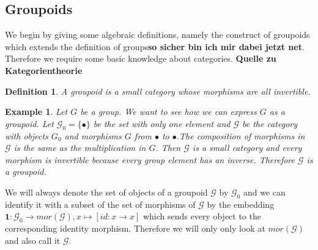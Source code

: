 \documentclass[12pt,a4paper]{scrartcl}
\newtheorem{Definition}[Theorem]{Definition}
\newtheorem{Example}[Theorem]{Example}
\numberwithin{equation}{section}
\newcommand{\2}{\mathbb{Z} / 2 \mathbb{Z}}
\newcommand{\1}{\overline{1}}
\newcommand{\0}{\overline{0}}
\begin{document}
\subsection{Groupoids}
We begin by giving some algebraic definitions, namely the construct of groupoids which extends the definition of groups\textbf{so sicher bin ich mir dabei jetzt net}. Therefore we require some basic knowledge about categories. \textbf{Quelle zu Kategorientheorie}
\begin{Definition}
	A groupoid is a small category whose morphisms are all invertible.
\end{Definition}
\begin{Example} \label{group}
	Let $G$ be a group. We want to see how we can express $G$ as a groupoid. Let $\mathcal{G}_0 = \{\bullet\}$ be the set with only one element  and $\mathcal{G}$ be the category with objects $G_0$ and morphisms $G$ from $\bullet$ to $\bullet$.The composition of morphisms in $\mathcal{G}$ is the same as the multiplication in $G$. Then $\mathcal{G}$ is a small category and every morphism is invertible because every group element has an inverse. Therefore $\mathcal{G}$ is a groupoid.
\end{Example}
We will always denote the set of objects of a groupoid $\mathcal{G}$ by $\mathcal{G}_0$ and we can identify it with a subset of the set of morphisms of $\mathcal{G}$ by the embedding $\textbf{1}: \mathcal{G}_0 \to mor(\mathcal{G}), x \mapsto [id: x \to x]$ which sends every object to the corresponding identity morphism. Therefore we will only only look at $mor(\mathcal{G})$ and also call it $\mathcal{G}$. 
\end{document}
